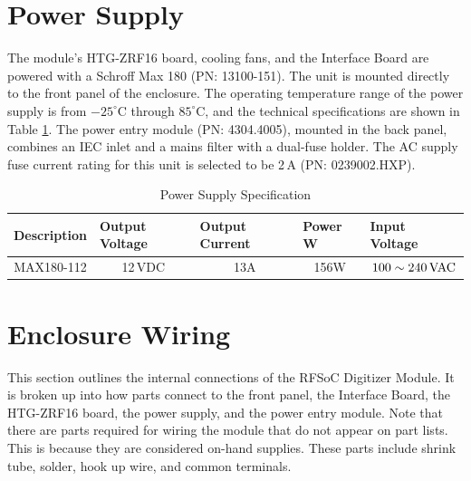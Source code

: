 \documentclass[12pt,a4paper,oneside]{article}
\begin{document}
\section{Power Supply}
\label{sec:5}

The module's HTG-ZRF16 board, cooling fans, and the Interface Board are powered with a Schroff Max 180 (PN: 13100-151). The unit is mounted directly to the front panel of the enclosure. The operating temperature range of the power supply is from $-25^{\circ}$C through $85^{\circ}$C, and the technical specifications are shown in Table \ref{tab:psu_spec}. The power entry module (PN: 4304.4005), mounted in the back panel, combines an IEC inlet and a mains filter with a dual-fuse holder. The AC supply fuse current rating for this unit is selected to be 2\,A (PN: 0239002.HXP). 

\begin{table}[H]
\centering
\caption{Power Supply Specification}
\label{tab:psu_spec}
\begin{tabular}{@{}ccccc@{}}
\toprule
\multicolumn{1}{l}{Description} & \multicolumn{1}{l}{Output Voltage} & \multicolumn{1}{l}{Output Current} & \multicolumn{1}{l}{Power W} & \multicolumn{1}{l}{Input Voltage} \\ \midrule
MAX180-112                         & 12\,VDC                               & 13A                               & 156W                         & $100 \sim 240\,\rm{VAC}$                              \\ \bottomrule
\end{tabular}
\end{table}



\section{Enclosure Wiring}
\label{sec:6}

This section outlines the internal connections of the RFSoC Digitizer Module. It is broken up into how parts connect to the front panel, the Interface Board, the HTG-ZRF16 board, the power supply, and the power entry module. Note that there are parts required for wiring the module that do not appear on part lists. This is because they are considered on-hand supplies. These parts include shrink tube, solder, hook up wire, and common terminals.
\end{document}
